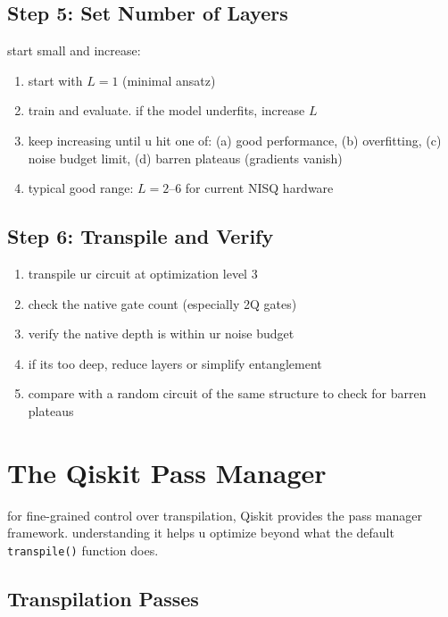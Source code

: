 \documentclass[11pt,a4paper]{article}
\theoremstyle{definition}
\theoremstyle{remark}
\begin{document}
\subsection{Step 5: Set Number of Layers}

start small and increase:
\begin{enumerate}[label=\arabic*.]
    \item start with $L = 1$ (minimal ansatz)
    \item train and evaluate. if the model underfits, increase $L$
    \item keep increasing until u hit one of: (a) good performance, (b) overfitting, (c) noise budget limit, (d) barren plateaus (gradients vanish)
    \item typical good range: $L = 2$--$6$ for current NISQ hardware
\end{enumerate}

\subsection{Step 6: Transpile and Verify}

\begin{enumerate}[label=\arabic*.]
    \item transpile ur circuit at optimization level 3
    \item check the native gate count (especially 2Q gates)
    \item verify the native depth is within ur noise budget
    \item if its too deep, reduce layers or simplify entanglement
    \item compare with a random circuit of the same structure to check for barren plateaus
\end{enumerate}

\section{The Qiskit Pass Manager}

for fine-grained control over transpilation, Qiskit provides the pass manager framework. understanding it helps u optimize beyond what the default \texttt{transpile()} function does.

\subsection{Transpilation Passes}
\end{document}
